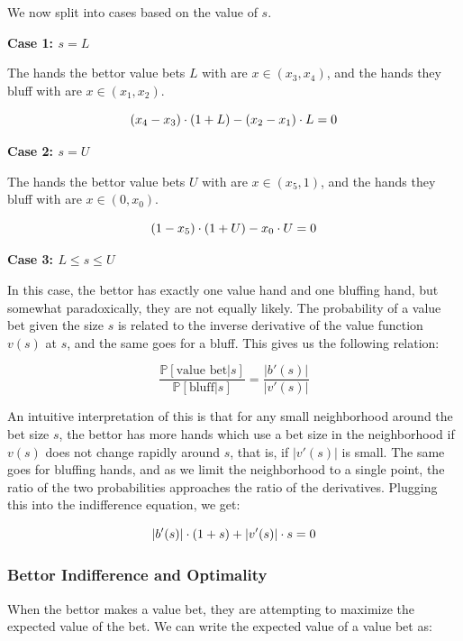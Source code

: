 \documentclass[a4paper,12pt]{article}
\theoremstyle{plain}
\theoremstyle{definition}
\begin{document}
We now split into cases based on the value of $s$.


\textbf{Case 1: $s = L$}

The hands the bettor value bets $L$ with are $x \in (x_3, x_4)$, and the hands they bluff with are $x \in (x_1, x_2)$. 

\begin{equation}{\label{callindiffmin}}
    (x_4-x_3) \cdot (1+L) - (x_2-x_1) \cdot L = 0
\end{equation}

\textbf{Case 2: $s = U$}

The hands the bettor value bets $U$ with are $x \in (x_5, 1)$, and the hands they bluff with are $x \in (0, x_0)$. 

\begin{equation}{\label{callindiffmax}}
    (1-x_5) \cdot (1+U) - x_0 \cdot U = 0
\end{equation}


\textbf{Case 3: $L \leq s \leq U$}

In this case, the bettor has exactly one value hand and one bluffing hand, but somewhat paradoxically, they are not equally likely. The probability of a value bet given the size $s$ is related to the inverse derivative of the value function $v(s)$ at $s$, and the same goes for a bluff. This gives us the following relation:

\[ \frac{\mathbb{P}[\text{value bet} | s]}{\mathbb{P}[\text{bluff} | s]} = \frac{|b'(s)|}{|v'(s)|}\]

An intuitive interpretation of this is that for any small neighborhood around the bet size $s$, the bettor has more hands which use a bet size in the neighborhood if $v(s)$ does not change rapidly around $s$, that is, if $|v'(s)|$ is small. The same goes for bluffing hands, and as we limit the neighborhood to a single point, the ratio of the two probabilities approaches the ratio of the derivatives. Plugging this into the indifference equation, we get:

\begin{equation}{\label{callindiff}}
    |b'(s)| \cdot (1 + s) + |v'(s)| \cdot s = 0
\end{equation}

\subsubsection{Bettor Indifference and Optimality}

When the bettor makes a value bet, they are attempting to maximize the expected value of the bet. We can write the expected value of a value bet as:
\end{document}
